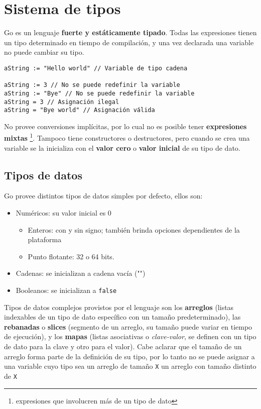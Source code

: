 \section{Sistema de tipos}

Go es un lenguaje \textbf{fuerte y estáticamente tipado}. Todas las expresiones tienen un tipo determinado en tiempo de compilación, y una vez declarada una variable no puede cambiar su tipo.

\vspace*{5mm}
\begin{lstlisting}[title=\centering Ejemplos de asignaciones válidas e inválidas (nótese el uso de los operadores \dq{:=} y \dq{=})]
aString := "Hello world" // Variable de tipo cadena

aString := 3 // No se puede redefinir la variable
aString := "Bye" // No se puede redefinir la variable
aString = 3 // Asignación ilegal
aString = "Bye world" // Asignación válida

\end{lstlisting}

No provee conversiones implícitas, por lo cual no es posible tener \textbf{expresiones mixtas} \footnote{expresiones que involucren más de un tipo de dato}. Tampoco tiene constructores o destructores, pero cuando se crea una variable se la inicializa con el \textbf{valor cero} o \textbf{valor inicial} de su tipo de dato.

\subsection{Tipos de datos}

Go provee distintos tipos de datos simples por defecto, ellos son:

\begin{itemize}
    \item Numéricos: su valor inicial es 0
    \begin{itemize}
        \item Enteros: con y sin signo; también brinda opciones dependientes de la plataforma
        \item Punto flotante: 32 o 64 bits.
    \end{itemize}
    \item Cadenas: se inicializan a cadena vacía ("")
    \item Booleanos: se inicializan a \texttt{false} 
\end{itemize}

Tipos de datos complejos provistos por el lenguaje son los \textbf{arreglos} (listas indexables de un tipo de dato específico con un tamaño predeterminado), las \textbf{rebanadas} o \textbf{slices} (segmento de un arreglo, su tamaño puede variar en tiempo de ejecución), y los \textbf{mapas} (listas asociativas o \emph{clave-valor}, se definen con un tipo de dato para la clave y otro para el valor). Cabe aclarar que el tamaño de un arreglo forma parte de la definición de su tipo, por lo tanto no se puede asignar a una variable cuyo tipo sea un arreglo de tamaño \texttt{X} un arreglo con tamaño distinto de \texttt{X} 

